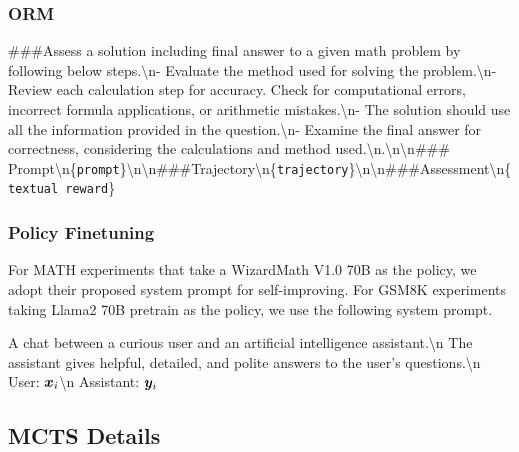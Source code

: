 \subsubsection{ORM}
\begin{tcolorbox}
\#\#\#Assess a solution including final answer to a given math problem by following below steps.\textbackslash n- Evaluate the method used for solving the problem.\textbackslash n- Review each calculation step for accuracy. Check for computational errors, incorrect formula applications, or arithmetic mistakes.\textbackslash n- The solution should use all the information provided in the question.\textbackslash n- Examine the final answer for correctness, considering the calculations and method used.\textbackslash n.\textbackslash n\textbackslash n\#\#\# Prompt\textbackslash n\{\texttt{prompt}\}\textbackslash n\textbackslash n\#\#\#Trajectory\textbackslash n\{\texttt{trajectory}\}\textbackslash n\textbackslash n\#\#\#Assessment\textbackslash n\{\texttt{textual reward}\}
\end{tcolorbox}

\subsubsection{Policy Finetuning}

For MATH experiments that take a WizardMath V1.0 70B as the policy, we adopt their proposed system prompt for self-improving.
For GSM8K experiments taking Llama2 70B pretrain as the policy, we use the following system prompt.
\begin{tcolorbox}
A chat between a curious user and an artificial intelligence assistant.\textbackslash n
The assistant gives helpful, detailed, and polite answers to the user's questions.\textbackslash n
User: ${\bm{x}}_i$\textbackslash n
Assistant: ${\bm{y}}_i$
\end{tcolorbox}


\subsection{MCTS Details}
\label{app:implementation}

